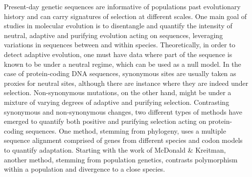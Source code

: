 \documentclass{article}
\begin{document}
    Present-day genetic sequences are informative of populations past evolutionary history and can carry signatures of selection at different scales.
    One main goal of studies in molecular evolution is to disentangle and quantify the intensity of neutral, adaptive and purifying evolution acting on sequences, leveraging variations in sequences between and within species.
    Theoretically, in order to detect adaptive evolution, one must have data where part of the sequence is known to be under a neutral regime, which can be used as a null model.
    In the case of protein-coding DNA sequences, synonymous sites are usually taken as proxies for neutral sites, although there are instance where they are indeed under selection\cite{bailey_adaptive_2014}.
    Non-synonymous mutations, on the other hand, might be under a mixture of varying degrees of adaptive and purifying selection.
    Contrasting synonymous and non-synonymous changes, two different types of methods have emerged to quantify both positive and purifying selection acting on protein-coding sequences.
    One method, stemming from phylogeny, uses a multiple sequence alignment comprised of genes from different species and codon models to quantify adaptation\cite{muse_likelihood_1994,goldman_codonbased_1994}.
    Starting with the work of McDonald \& Kreitman\cite{mcdonald_adaptative_1991}, another method, stemming from population genetics, contrasts polymorphism within a population and divergence to a close species.
\end{document}
